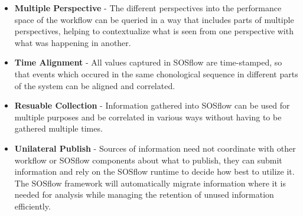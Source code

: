      \begin{itemize}
        \item \textbf{Multiple Perspective} - The different
          perspectives into the performance space of the workflow can
          be queried in a way that includes parts of multiple
          perspectives, helping to contextualize what is seen from one
          perspective with what was happening in another.
        \item \textbf{Time Alignment} - All values captured in SOSflow
          are time-stamped, so that events which occured in the same
          chonological sequence in different parts of the system can be
          aligned and correlated.
        \item \textbf{Resuable Collection} - Information gathered into
          SOSflow can be used for multiple purposes and be correlated
          in various ways without having to be gathered multiple
          times.
        \item \textbf{Unilateral Publish} - Sources of information
          need not coordinate with other workflow or SOSflow
          components about what to publish, they can submit
          information and rely on the SOSflow runtime to decide
          how best to utilize it.
          The SOSflow framework will automatically migrate
          information where it is needed for analysis while managing
          the retention of unused information efficiently.
     \end{itemize}





